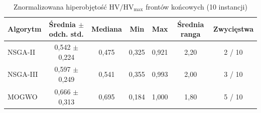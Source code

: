 \begin{table}[htbp]
    \centering
    \caption{Znormalizowana hiperobjętość $\mathrm{HV}/\mathrm{HV}_{\max}$ frontów końcowych (10 instancji)}
    \label{tab:hv_summary}
    \begin{tabular}{l c c c c c c}
        \hline
        Algorytm & Średnia $\pm$ odch. std. & Mediana & Min & Max & Średnia ranga & Zwycięstwa \\
        \hline
        NSGA-II & 0{,}542 $\pm$ 0{,}224 & 0{,}475 & 0{,}325 & 0{,}921 & 2{,}20 & 2 / 10 \\
        NSGA-III & 0{,}597 $\pm$ 0{,}249 & 0{,}541 & 0{,}355 & 0{,}993 & 2{,}00 & 3 / 10 \\
        MOGWO & 0{,}666 $\pm$ 0{,}313 & 0{,}695 & 0{,}184 & 1{,}000 & 1{,}80 & 5 / 10 \\
        \hline
    \end{tabular}
\end{table}
